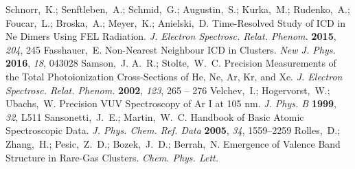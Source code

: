 \documentclass[journal=jpccck,manuscript=article]{achemso}
\begin{document}
\begin{mcitethebibliography}{73}
\mciteBstWouldAddEndPuncttrue
\mciteSetBstMidEndSepPunct{\mcitedefaultmidpunct}
{\mcitedefaultendpunct}{\mcitedefaultseppunct}\relax
\EndOfBibitem
{}
Schnorr,~K.; Senftleben,~A.; Schmid,~G.; Augustin,~S.; Kurka,~M.; Rudenko,~A.;
  Foucar,~L.; Broska,~A.; Meyer,~K.; Anielski,~D. 
  {Time-Resolved Study of ICD in Ne Dimers Using FEL Radiation}. \emph{J.
  Electron Spectrosc. Relat. Phenom.} \textbf{2015}, \emph{204}, 245\relax
\mciteBstWouldAddEndPuncttrue
\mciteSetBstMidEndSepPunct{\mcitedefaultmidpunct}
{\mcitedefaultendpunct}{\mcitedefaultseppunct}\relax
\EndOfBibitem
{}
Fasshauer,~E. Non-Nearest Neighbour ICD in Clusters. \emph{New J. Phys.}
  \textbf{2016}, \emph{18}, 043028\relax
\mciteBstWouldAddEndPuncttrue
\mciteSetBstMidEndSepPunct{\mcitedefaultmidpunct}
{\mcitedefaultendpunct}{\mcitedefaultseppunct}\relax
\EndOfBibitem
{}
Samson,~J. A.~R.; Stolte,~W.~C. Precision Measurements of the Total
  Photoionization Cross-Sections of He, Ne, Ar, Kr, and Xe. \emph{J. Electron
  Spectrosc. Relat. Phenom.} \textbf{2002}, \emph{123}, 265 -- 276\relax
\mciteBstWouldAddEndPuncttrue
\mciteSetBstMidEndSepPunct{\mcitedefaultmidpunct}
{\mcitedefaultendpunct}{\mcitedefaultseppunct}\relax
\EndOfBibitem
{}
Velchev,~I.; Hogervorst,~W.; Ubachs,~W. Precision VUV Spectroscopy of Ar I at
  105 nm. \emph{J. Phys. B} \textbf{1999}, \emph{32}, L511\relax
\mciteBstWouldAddEndPuncttrue
\mciteSetBstMidEndSepPunct{\mcitedefaultmidpunct}
{\mcitedefaultendpunct}{\mcitedefaultseppunct}\relax
\EndOfBibitem
{}
Sansonetti,~J.~E.; Martin,~W.~C. Handbook of Basic Atomic Spectroscopic Data.
  \emph{J. Phys. Chem. Ref. Data} \textbf{2005}, \emph{34}, 1559--2259\relax
\mciteBstWouldAddEndPuncttrue
\mciteSetBstMidEndSepPunct{\mcitedefaultmidpunct}
{\mcitedefaultendpunct}{\mcitedefaultseppunct}\relax
\EndOfBibitem
{}
Rolles,~D.; Zhang,~H.; Pesic,~Z.~D.; Bozek,~J.~D.; Berrah,~N. Emergence of
  Valence Band Structure in Rare-Gas Clusters. \emph{Chem. Phys. Lett.}

\end{mcitethebibliography}
\end{document}
